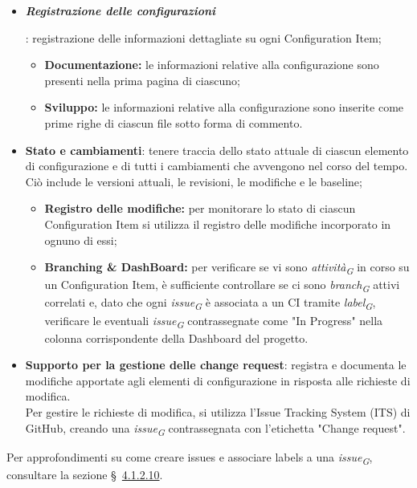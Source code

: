 \begin{itemize}
    \item \hypertarget{item:registrazioneconfigurazioni}{\textit{\textbf{Registrazione delle configurazioni}}}: registrazione delle informazioni dettagliate su ogni Configuration Item;
          \begin{itemize}
              \item  \textbf{Documentazione:} le informazioni relative alla configurazione sono presenti nella prima pagina di ciascuno;
              \item  \textbf{Sviluppo:} le informazioni relative alla configurazione sono inserite come prime righe di ciascun file sotto forma di commento.
          \end{itemize}
    \item \textbf{Stato e cambiamenti}: tenere traccia dello stato attuale di ciascun elemento di configurazione e di tutti i cambiamenti che avvengono nel corso del tempo. \\
    Ciò include le versioni attuali, le revisioni, le modifiche e le baseline;
        \begin{itemize}
            \item \textbf{Registro delle modifiche:} per monitorare lo stato di ciascun Configuration Item si utilizza il registro delle modifiche incorporato in ognuno di essi;
            \item \textbf{Branching \& DashBoard:} per verificare se vi sono \textit{attività}\textsubscript{\textit{G}} in corso su un Configuration Item, è sufficiente controllare se ci sono \textit{branch}\textsubscript{\textit{G}} attivi correlati e, dato che ogni \textit{issue}\textsubscript{\textit{G}} è associata a un CI tramite \textit{label}\textsubscript{\textit{G}}, verificare le eventuali \textit{issue}\textsubscript{\textit{G}} contrassegnate come "In Progress" nella colonna corrispondente della Dashboard del progetto.
        \end{itemize}
    \item \textbf{Supporto per la gestione delle change request}: registra e documenta le modifiche apportate agli elementi di configurazione in risposta alle richieste di modifica. \\
    Per gestire le richieste di modifica, si utilizza l'Issue Tracking System (ITS) di GitHub, creando una \textit{issue}\textsubscript{\textit{G}} contrassegnata con l'etichetta "Change request".
\end{itemize}

Per approfondimenti su come creare issues e associare labels a una \textit{issue}\textsubscript{\textit{G}}, consultare la sezione \S~\hyperlink{par:ticketing}{4.1.2.10}.

